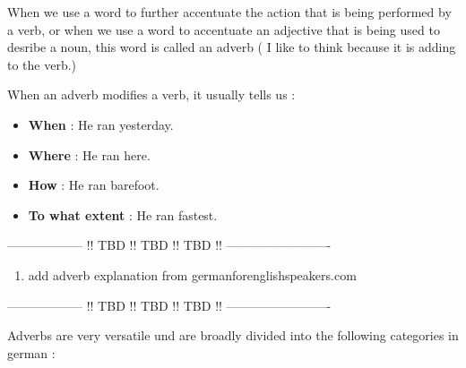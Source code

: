 \documentclass[a4paper,12pt]{article}
\begin{document}
When we use a word to further accentuate the action that is being performed by
a verb, or when we use a word to accentuate an adjective that is being used to
desribe a noun, this word is called an adverb ( I like to think because it is
adding to the verb.)


\vspace{0.25cm}


When an adverb modifies a verb, it usually tells us :

\begin{itemize}[noitemsep]
	\item \textbf {When} : He ran yesterday.
	\item \textbf {Where} : He ran here.
	\item \textbf{How }: He ran barefoot.
	\item \textbf{To what extent }: He ran fastest.
\end{itemize}


\begin{center}
\color{red}
------------------ !! TBD !! TBD !! TBD !! -------------------------

\begin{enumerate}[noitemsep]
	\item add adverb explanation from germanforenglishspeakers.com 
\end{enumerate}

------------------ !! TBD !! TBD !! TBD !! -------------------------
\color{black}
\end{center}


Adverbs are very versatile und are broadly divided into the following categories
in german :

\end{document}
